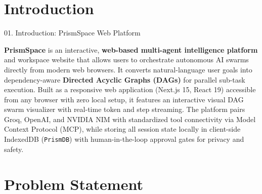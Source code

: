 \documentclass[aspectratio=169,10pt]{beamer}
\begin{document}
\section{Introduction}

\begin{frame}[c]{01. Introduction: PrismSpace Web Platform}
\centering
\begin{minipage}{0.94\linewidth}
\begin{tcolorbox}[
  enhanced, arc=5pt, colframe=lavenderDark!80, colback=lavenderLight!25,
  boxrule=0.9pt,
  left=14pt, right=14pt, top=12pt, bottom=12pt
]
\fontsize{8.6}{12.6}\selectfont\sffamily\color{lavenderDeep}
  \textbf{\fontsize{10.2}{13.0}\selectfont\color{lavenderDark}PrismSpace} is an interactive, \textbf{web-based multi-agent intelligence platform} and workspace website that allows users to orchestrate autonomous AI swarms directly from modern web browsers. It converts natural-language user goals into dependency-aware \textbf{Directed Acyclic Graphs (DAGs)} for parallel sub-task execution. Built as a responsive web application (Next.js 15, React 19) accessible from any browser with zero local setup, it features an interactive visual DAG swarm visualizer with real-time token and step streaming. The platform pairs Groq, OpenAI, and NVIDIA NIM with standardized tool connectivity via Model Context Protocol (MCP), while storing all session state locally in client-side IndexedDB (\texttt{PrismDB}) with human-in-the-loop approval gates for privacy and safety.
\end{tcolorbox}
\end{minipage}
\end{frame}

\section{Problem Statement}
\end{document}
